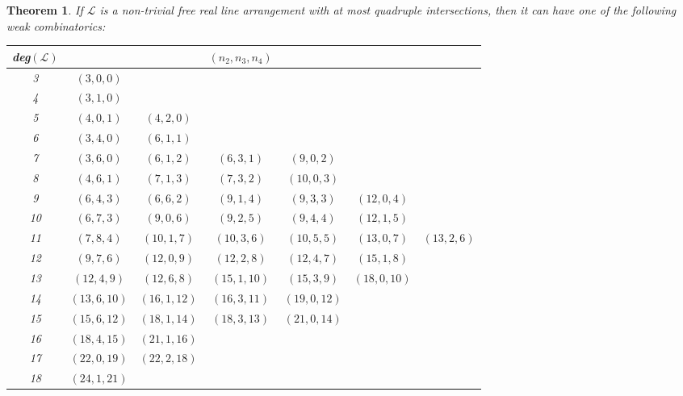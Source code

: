 \documentclass[12pt]{article}
\theoremstyle{plain}
\newtheorem{theorem}[thm]{Theorem}
\theoremstyle{definition}
\begin{document}
\newpage
\begin{theorem}\label{ThExists}
If $\mathcal{L}$ is a non-trivial free real line arrangement with at most quadruple intersections, then it can have one of the following weak combinatorics:
\begin{table}[ht]
\centering
\small
\begin{tabular}{|c||cccccc|}
\hline
{\rm deg}$(\mathcal{L})$ &&&$(n_2,n_3,n_4)$&&&\\ \hline\hline
3 &$(3,0,0)$&&&&&\\ \hline
4 &$(3,1,0)$&&&&&\\ \hline
5 &$(4,0,1)$&$(4,2,0)$&&&&\\ \hline
6 &$(3,4,0)$&$(6,1,1)$&&&&\\ \hline
7 &$(3,6,0)$&$(6,1,2)$&$(6,3,1)$&$(9,0,2)$&&\\ \hline
8 &$(4,6,1)$&$(7,1,3)$&$(7,3,2)$&$(10,0,3)$&&\\ \hline
9 &$(6,4,3)$&$(6,6,2)$&$(9,1,4)$&$(9,3,3)$& $(12,0,4)$&\\ \hline
10 &$(6,7,3)$ & $(9,0,6)$&$(9,2,5)$&$(9,4,4)$&$(12,1,5)$&\\ \hline
11 &$(7,8,4)$&$(10,1,7)$&$(10,3,6)$&$(10,5,5)$&$(13,0,7)$&$(13,2,6)$  \\ \hline
12 &$(9,7,6)$&$(12,0,9)$&$(12,2,8)$&$(12,4,7)$& $(15,1,8)$& \\ \hline
13 &$(12,4,9)$&$(12,6,8)$&$(15,1,10)$&$(15,3,9)$&$(18,0,10)$&\\ \hline
14 &$(13,6,10)$&$(16,1,12)$&$(16,3,11)$&$(19,0,12)$&&\\ \hline
15 &$(15,6,12)$&$(18,1,14)$&$(18,3,13)$&$(21,0,14)$&&\\ \hline
16 &$(18,4,15)$&$(21,1,16)$&&&&\\ \hline
17 &$(22,0,19)$&$(22,2,18)$&&&&\\ \hline
18 & $(24,1,21)$&&&&&\\ \hline
\end{tabular}
\end{table}
\end{theorem}
\end{document}
